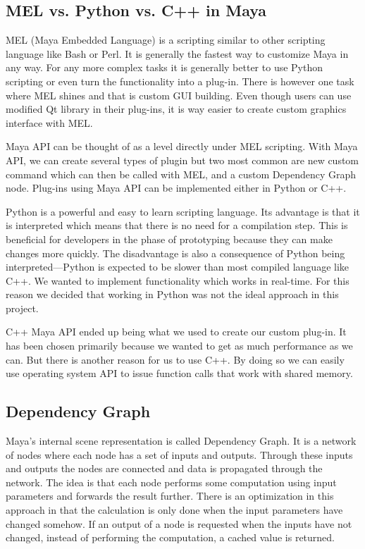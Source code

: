 \documentclass[
  digital, %
  table,   %
  nolof,     %
  nolot,     %
]{fithesis3}
\begin{document}

\subsection{MEL vs. Python vs. C++ in Maya}
MEL (Maya Embedded Language) is a scripting similar to other scripting language like Bash or Perl. It is generally the fastest way to customize Maya in any way. For any more complex tasks it is generally better to use Python scripting or even turn the functionality into a plug-in. There is however one task where MEL shines and that is custom GUI building. Even though users can use modified Qt library in their plug-ins, it is way easier to create custom graphics interface with MEL.

Maya API can be thought of as a level directly under MEL scripting. With Maya API, we can create several types of plugin but two most common are new custom command which can then be called with MEL, and a custom Dependency Graph node. Plug-ins using Maya API can be implemented either in Python or C++.

Python is a powerful and easy to learn scripting language. Its advantage is that it is interpreted which means that there is no need for a compilation step. This is beneficial for developers in the phase of prototyping because they can make changes more quickly. The disadvantage is also a consequence of Python being interpreted—Python is expected to be slower than most compiled language like C++. We wanted to implement functionality which works in real-time. For this reason we decided that working in Python was not the ideal approach in this project.

C++ Maya API ended up being what we used to create our custom plug-in. It has been chosen primarily because we wanted to get as much performance as we can. But there is another reason for us to use C++. By doing so we can easily use operating system API to issue function calls that work with shared memory.

\subsection{Dependency Graph}
Maya's internal scene representation is called Dependency Graph. It is a network of nodes where each node has a set of inputs and outputs. Through these inputs and outputs the nodes are connected and data is propagated through the network. The idea is that each node performs some computation using input parameters and forwards the result further. There is an optimization in this approach in that the calculation is only done when the input parameters have changed somehow. If an output of a node is requested when the inputs have not changed, instead of performing the computation, a cached value is returned.
\end{document}
